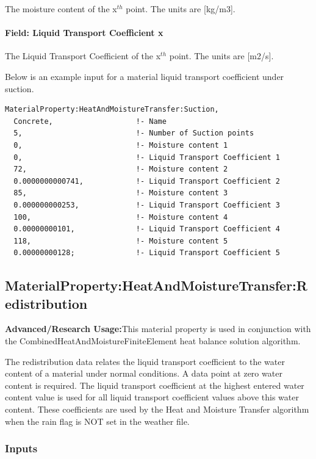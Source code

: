 The moisture content of the x\(^{th}\) point. The units are {[}kg/m3{]}.

\paragraph{Field: Liquid Transport Coefficient x}\label{field-liquid-transport-coefficient-x}

The Liquid Transport Coefficient of the x\(^{th}\) point. The units are {[}m2/s{]}.

Below is an example input for a material liquid transport coefficient under suction.

\begin{lstlisting}
MaterialProperty:HeatAndMoistureTransfer:Suction,
  Concrete,                   !- Name
  5,                          !- Number of Suction points
  0,                          !- Moisture content 1
  0,                          !- Liquid Transport Coefficient 1
  72,                         !- Moisture content 2
  0.0000000000741,            !- Liquid Transport Coefficient 2
  85,                         !- Moisture content 3
  0.000000000253,             !- Liquid Transport Coefficient 3
  100,                        !- Moisture content 4
  0.00000000101,              !- Liquid Transport Coefficient 4
  118,                        !- Moisture content 5
  0.00000000128;              !- Liquid Transport Coefficient 5
\end{lstlisting}

\subsection{MaterialProperty:HeatAndMoistureTransfer:Redistribution}\label{materialpropertyheatandmoisturetransferredistribution}

\textbf{Advanced/Research Usage:}This material property is used in conjunction with the CombinedHeatAndMoistureFiniteElement heat balance solution algorithm.

The redistribution data relates the liquid transport coefficient to the water content of a material under normal conditions. A data point at zero water content is required. The liquid transport coefficient at the highest entered water content value is used for all liquid transport coefficient values above this water content. These coefficients are used by the Heat and Moisture Transfer algorithm when the rain flag is NOT set in the weather file.

\subsubsection{Inputs}\label{inputs-10-020}

